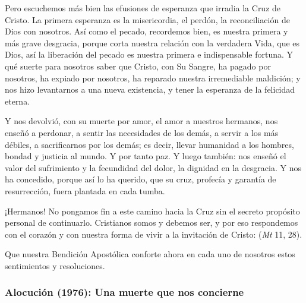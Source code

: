 \begin{body}
Pero escuchemos más bien las efusiones de esperanza que irradia la Cruz de Cristo. La primera esperanza es la misericordia, el perdón, la reconciliación de Dios con nosotros. Así como el pecado, recordemos bien, es nuestra primera y más grave desgracia, porque corta nuestra relación con la verdadera Vida, que es Dios, así la liberación del pecado es nuestra primera e indispensable fortuna. Y qué suerte para nosotros saber que Cristo, con Su Sangre, ha pagado por nosotros, ha expiado por nosotros, ha reparado nuestra irremediable maldición; y nos hizo levantarnos a una nueva existencia, y tener la esperanza de la felicidad eterna.

Y nos devolvió, con su muerte por amor, el amor a nuestros hermanos, nos enseñó a perdonar, a sentir las necesidades de los demás, a servir a los más débiles, a sacrificarnos por los demás; es decir, llevar humanidad a los hombres, bondad y justicia al mundo. Y por tanto paz. Y luego también: nos enseñó el valor del sufrimiento y la fecundidad del dolor, la dignidad en la desgracia. Y nos ha concedido, porque así lo ha querido, que su cruz, profecía y garantía de resurrección, fuera plantada en cada tumba. 

¡Hermanos! No pongamos fin a este camino hacia la Cruz sin el secreto propósito personal de continuarlo. Cristianos somos y debemos ser, y por eso respondemos con el corazón y con nuestra forma de vivir a la invitación de Cristo:  (\textit{Mt} 11, 28).

Que nuestra Bendición Apostólica conforte ahora en cada uno de nosotros estos sentimientos y resoluciones.
\end{body}

\subsubsection{Alocución (1976): Una muerte que nos concierne}


